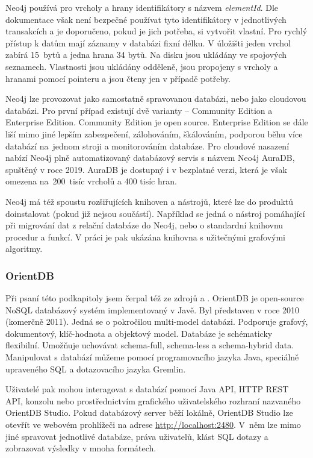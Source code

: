 \documentclass[
  program=infoi,
  biblatex=true,
  figures=true,
  glossaries=false,
  index,
  sourcecodes=true
]{kidiplom}
\begin{document}
Neo4j používá pro vrcholy a hrany identifikátory s názvem \textit{elementId}. Dle dokumentace však není bezpečné používat tyto identifikátory v jednotlivých transakcích a je doporučeno, pokud je jich potřeba, si vytvořit vlastní. Pro rychlý přístup k datům mají záznamy v databázi fixní délku. V úložišti jeden vrchol zabírá 15~bytů a jedna hrana 34 bytů. Na disku jsou ukládány ve spojových seznamech. Vlastnosti jsou ukládány odděleně, jsou propojeny s vrcholy a hranami pomocí pointeru a jsou čteny jen v případě potřeby.

Neo4j lze provozovat jako samostatně spravovanou databázi, nebo jako cloudovou databázi. Pro první případ existují dvě varianty – Community Edition a Enterprise Edition. Community Edition je open source. Enterprise Edition se dále liší mimo jiné lepším zabezpečení, zálohováním, škálováním, podporou běhu více databází na~jednom stroji a monitorováním databáze. Pro cloudové nasazení nabízí Neo4j plně automatizovaný databázový servis s názvem Neo4j AuraDB, spuštěný v roce 2019. AuraDB je dostupný i v bezplatné verzi, která je však omezena na~200~tisíc vrcholů a 400 tisíc hran.

Neo4j má též spoustu rozšiřujících knihoven a nástrojů, které lze do produktů doinstalovat (pokud již nejsou součástí). Například se jedná o nástroj pomáhající při migrování dat z relační databáze do Neo4j, nebo o standardní knihovnu procedur a funkcí. V práci je pak ukázána knihovna s užitečnými grafovými algoritmy.

\subsubsection{OrientDB}
Při psaní této podkapitoly jsem čerpal též ze zdrojů \cite{orientDBDoc} a \cite{benchmark}. OrientDB je open-source NoSQL databázový systém implementovaný v Javě. Byl představen v roce 2010 (komerčně 2011). Jedná se o pokročilou multi-model databázi. Podporuje grafový, dokumentový, klíč-hodnota a objektový model. Databáze je schématicky flexibilní. Umožňuje uchovávat schema-full, schema-less a schema-hybrid data. Manipulovat s databází můžeme pomocí programovacího jazyka Java, speciálně upraveného SQL a dotazovacího jazyka Gremlin.

Uživatelé pak mohou interagovat s databází pomocí Java API, HTTP REST API, konzolu nebo prostřednictvím grafického uživatelského rozhraní nazvaného OrientDB Studio. Pokud databázový server běží lokálně, OrientDB Studio lze otevřít ve webovém prohlížeči na adrese \url{http://localhost:2480}. V~něm lze mimo jiné spravovat jednotlivé databáze, práva uživatelů, klást SQL dotazy a zobrazovat výsledky v mnoha formátech.
\end{document}
